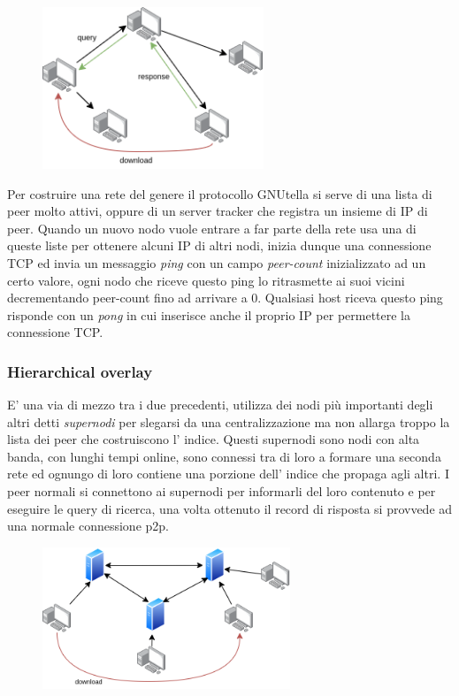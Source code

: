 \begin{figure}[H]
    \centering
    \includegraphics[width=250px]{images/2_Applicazioni_di_rete/query_flooding.png}
\end{figure}

Per costruire una rete del genere il protocollo GNUtella si serve di una lista di peer molto attivi, oppure di un server tracker che registra un insieme di IP di peer.
Quando un nuovo nodo vuole entrare a far parte della rete usa una di queste liste per ottenere alcuni IP di altri nodi, inizia dunque una connessione TCP ed invia un messaggio \emph{ping} con un campo \emph{peer-count} inizializzato ad un certo valore, ogni nodo che riceve questo ping lo ritrasmette ai suoi vicini decrementando peer-count fino ad arrivare a 0.
Qualsiasi host riceva questo ping risponde con un \emph{pong} in cui inserisce anche il proprio IP per permettere la connessione TCP.

\subsubsection{Hierarchical overlay}
E' una via di mezzo tra i due precedenti, utilizza dei nodi più importanti degli altri detti \emph{supernodi} per slegarsi da una centralizzazione ma non allarga troppo la lista dei peer che costruiscono l' indice.
Questi supernodi sono nodi con alta banda, con lunghi tempi online, sono connessi tra di loro a formare una seconda rete ed ognungo di loro contiene una porzione dell' indice che propaga agli altri.
I peer normali si connettono ai supernodi per informarli del loro contenuto e per eseguire le query di ricerca, una volta ottenuto il record di risposta si provvede ad una normale connessione p2p.

\begin{figure}[H]
    \centering
    \includegraphics[width=280px]{images/2_Applicazioni_di_rete/hierarchical_overlay.png}
\end{figure}

